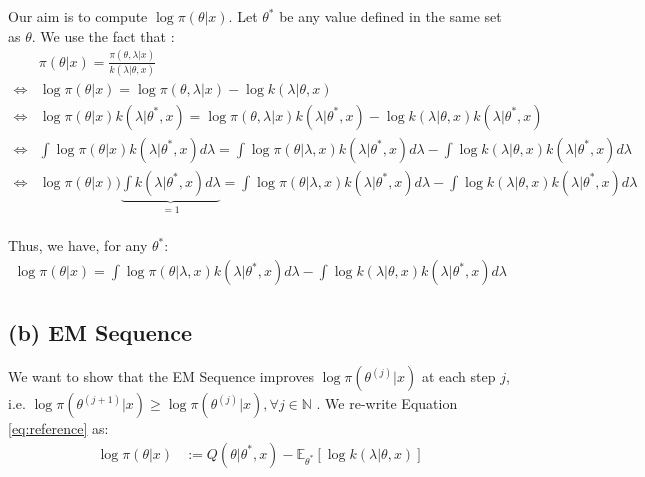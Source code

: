 \documentclass{article}
\newcommand{\N}{\mathbb N}
\begin{document}
Our aim is to compute $\log \pi(\theta|x)$. Let $\theta^*$ be any value 
defined in the same set as $\theta$. We use the fact that :
\begin{align*}
   &  \pi(\theta|x) = \frac{\pi(\theta ,\lambda | x)}
                            { k(\lambda | \theta, x)} \\
   \Leftrightarrow & \log\pi(\theta|x) =
                             \log\pi(\theta , \lambda |x)
                              - \log k(\lambda | \theta, x) \\
    \Leftrightarrow  &\log\pi(\theta|x)k(\lambda |\theta^*, x) = 
                              \log\pi(\theta , \lambda| x)
                               k(\lambda |\theta^*, x)
                               - \log k(\lambda | \theta , x)
                               k(\lambda |\theta^*, x) \\
   \Leftrightarrow & \int \log\pi(\theta|x)k(\lambda |\theta^*, x) d\lambda
                    = \int \log\pi(\theta |\lambda, x) k(\lambda |\theta^*, x) d\lambda
                     - \int \log k(\lambda | \theta , x)k(\lambda |\theta^*, x) d\lambda \\
\Leftrightarrow  &\log\pi(\theta|x))\underset{=1}{\underbrace{\int k(\lambda |\theta^*, x) d\lambda}}
                     = \int \log\pi(\theta |\lambda, x) k(\lambda |\theta^*, x) d\lambda
                      - \int \log k(\lambda | \theta , x)k(\lambda |\theta^*, x) d\lambda \\
                    \end{align*}

\noindent Thus, we have, for any $\theta^*$:
\begin{align}\label{eq:reference}
    \log\pi(\theta|x) 
    = \int \log\pi(\theta |\lambda, x) k(\lambda |\theta^*, x) d\lambda
     - \int \log k(\lambda | \theta , x)k(\lambda |\theta^*, x) d\lambda 
\end{align}

\subsection*{(b) EM Sequence}
We want to show that the EM Sequence improves $\log \pi(\theta^{(j)}|x)$ at each step $j$, i.e.
$\log \pi(\theta^{(j+1)}|x) \geq \log \pi(\theta^{(j)}|x), \forall j \in \N$ . 
We re-write Equation \ref{eq:reference} as:
\begin{align}\label{eq:ref2}
    \log \pi(\theta |x )&:=  Q(\theta|\theta^{*}, x) 
    - \mathbb{E}_{\theta^{*}}[\log k(\lambda |\theta, x)]
\end{align}
\end{document}

